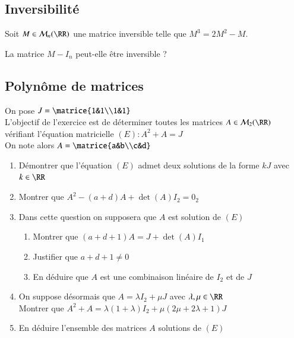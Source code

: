 \documentclass[oneside,12pt]{article}          %
\begin{document}
\subsection{Inversibilité}
Soit $M\in\mathcal{M}_n(\RR)$ une matrice inversible telle que $M^3=2M^2-M$.

La matrice $M-I_n$ peut-elle être inversible ?



\subsection{Polynôme de matrices}
On pose $J=\matrice{1&1\\1&1}$ \\
L'objectif de l'exercice est de déterminer toutes les matrices $A\in\mathcal{M}_2(\RR)$ vérifiant l'équation matricielle $(E) : A^2+A=J$ \\
On note alors $A=\matrice{a&b\\c&d}$
\begin{enumerate}
    \item Démontrer que l'équation $(E)$ admet deux solutions de la forme $kJ$ avec $k\in\RR$
    \item Montrer que $A^2-(a+d)A+\det(A)I_2=0_2$
    \item Dans cette question on supposera que $A$ est solution de $(E)$
    \begin{enumerate}
        \item Montrer que $(a+d+1)A=J+\det(A)I_1$
        \item Justifier que $a+d+1\neq0$
        \item En déduire que $A$ est une combinaison linéaire de $I_2$ et de $J$
    \end{enumerate}
    \item On suppose désormais que $A=\lambda I_2+\mu J$ \quad avec $\lambda,\mu\in\RR$\\[5pt]
    Montrer que $A^2+A=\lambda(1+\lambda)I_2+\mu(2\mu+2\lambda+1)J$
    \item En déduire l'ensemble des matrices $A$ solutions de $(E)$
\end{enumerate}
\end{document}
